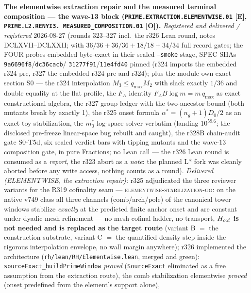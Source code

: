 \documentclass[11pt,a4paper]{article}
\begin{document}
\par\smallskip\noindent\textbf{The elementwise extraction repair
and the measured terminal composition --- the wave-13 block
(\texttt{PRIME.EXTRACTION.\allowbreak ELEMENTWISE.01} [E],
\texttt{PRIME.L2.\allowbreak RENYI3.\allowbreak
MEASURED\_COMPOSITION.01} [O]).}
{\sloppy
\emph{Registered and delivered / registered} 2026-08-27 (rounds
323--327 incl.\ the r326 Lean round, notes DCLXVII--DCLXXII;
 with $36/36 + 36/36 +
18/18 + 34/34$ full record gates; the FOUR probes embedded
byte-exact in their sealed \texttt{--smoke} stage, SPEC SHAs
\texttt{9a6696f8}/\allowbreak\texttt{dc36cacb}/\allowbreak
\texttt{31277f91}/\allowbreak\texttt{11e4fd40} pinned (r324
imports the embedded r324-pre, r327 the embedded r324-pre and
r324); plus the module-own exact section S0 --- the r324
interpolation $M_3 \le q_{\max} M_2$ with slack exactly $1/36$ and
double equality at the flat profile, the $F_A$ identity
$F_A B \log m = m\,q_{\max}$ as exact constructional algebra, the
r327 group ledger with the two-ancestor bound (both mutants break
by exactly 1), the r325 onset formula $\alpha^* = (n_g+1)D_0/2$ as
an exact toy stabilization, the $m_0^*$ log-space solver verbatim
(landing $10^{59.6}$; the disclosed pre-freeze linear-space bug
rebuilt and caught), the r328B chain-audit gate S0-T5d, six sealed
verdict bars with tipping mutants
and the wave-13 composition gate, in pure Fractions; no Lean call
--- the r326 Lean round is consumed as a \emph{report}, the r323
abort as a \emph{note}: the planned L* fork was cleanly aborted
before any write access, nothing counts as a round).
\emph{Delivered (ELEMENTWISE, the extraction repair):} r325
adjudicated the three reviewer variants for the R319 cofinality
seam --- \textsc{elementwise-stabilization-go}: on the native v749
class all three channels (comb/arch/pole) of the canonical tower
windows stabilize \emph{exactly} at the predicted finite anchor
onset and are constant under dyadic mesh refinement --- no
mesh-cofinal ladder, no transport, \textbf{$H_{\rm cof}$ is not
needed and is replaced as the target route} (variant B $=$ the
construction substrate, variant C $=$ the quantified density step
inside the rigorous interpolation envelope, no wall margin
anywhere); r326 implemented the architecture
(\texttt{rh/lean/RH/Elementwise.lean}, merged and green):
\texttt{sourceExact\_buildPrimeWindow} \emph{proved}
(\texttt{SourceExact} eliminated as a free assumption from the
extraction route), the comb stabilization elementwise
\emph{proved} (onset predefined from the element's support alone),
}
\end{document}
